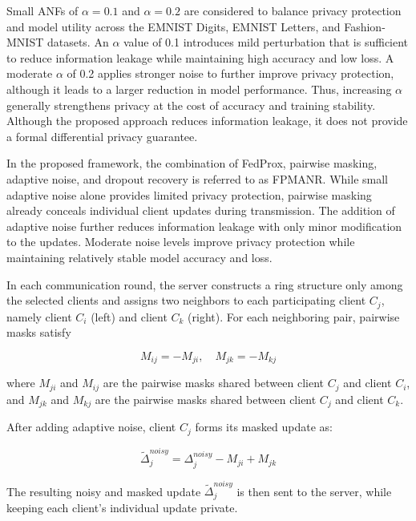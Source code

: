 \documentclass[a4paper,fleqn]{cas-dc}
\begin{document}
Small ANFs of $\alpha = 0.1$ and $\alpha = 0.2$ are considered to balance privacy protection and model utility across the EMNIST Digits, EMNIST Letters, and Fashion-MNIST datasets. An $\alpha$ value of 0.1 introduces mild perturbation that is sufficient to reduce information leakage while maintaining high accuracy and low loss. A moderate $\alpha$ of 0.2 applies stronger noise to further improve privacy protection, although it leads to a larger reduction in model performance. Thus, increasing $\alpha$ generally strengthens privacy at the cost of accuracy and training stability. Although the proposed approach reduces information leakage, it does not provide a formal differential privacy guarantee.

In the proposed framework, the combination of FedProx, pairwise masking, adaptive noise, and dropout recovery is referred to as FPMANR. While small adaptive noise alone provides limited privacy protection, pairwise masking already conceals individual client updates during transmission. The addition of adaptive noise further reduces information leakage with only minor modification to the updates. Moderate noise levels improve privacy protection while maintaining relatively stable model accuracy and loss.

In each communication round, the server constructs a ring structure only among the selected clients and assigns two neighbors to each participating client $C_{j}$, namely client $C_{i}$ (left) and client $C_{k}$ (right). For each neighboring pair, pairwise masks satisfy

\begin{equation}
M_{ij} = - M_{ji}, \quad M_{jk} = - M_{kj}
\label{eq:4}
\end{equation}

where $M_{ji}$ and $M_{ij}$ are the pairwise masks shared between client $C_{j}$ and client $C_{i}$, and $M_{jk}$ and $M_{kj}$ are the pairwise masks shared between client $C_{j}$ and client $C_{k}$.

After adding adaptive noise, client $C_{j}$ forms its masked update as:

\begin{equation}
{\widetilde{\Delta}}_{j}^{noisy} = \Delta_{j}^{noisy} - M_{ji} + M_{jk}
\label{eq:5}
\end{equation}

The resulting noisy and masked update ${\widetilde{\Delta}}_{j}^{noisy}$ is then sent to the server, while keeping each client's individual update private.
\end{document}
